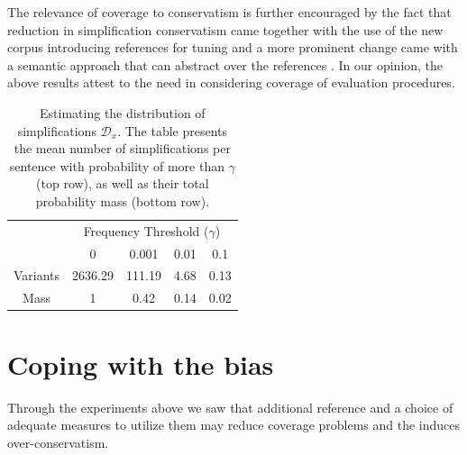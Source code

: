 \documentclass[letterpaper, 11pt]{article}
\begin{document}

 The relevance of coverage to conservatism is further encouraged by the fact that reduction in simplification conservatism came together with the use of the new corpus introducing references for tuning and a more prominent change came with a semantic approach that can abstract over the references \cite{zhang2017sentence}.
 In our opinion, the above results attest to the need in considering coverage of evaluation procedures.

\begin{table}[h!]
	\vspace{-0.5cm}
	\centering
	\small
	\singlespacing
	\begin{tabular}{c|c|c|c|c|}
		& \multicolumn{4}{c|}{Frequency Threshold ($\gamma$)}\\ 
		& \multicolumn{1}{c}{0} & \multicolumn{1}{c}{0.001} & \multicolumn{1}{c}{0.01} & \multicolumn{1}{c|}{0.1}
		\\
		\hline
		Variants & 2636.29 & 111.19 & 4.68 & 0.13
		\\
		Mass & 1 & 0.42 & 0.14 & 0.02\\
		\hline
	\end{tabular}
	\caption{\label{tab:simplifications_dist}
		Estimating the distribution of simplifications $\mathcal{D}_x$.
		The table presents the mean number of simplifications per sentence with probability of more than
		$\gamma$ (top row), as well as their total probability mass (bottom row).
	}
	\vspace{-0.3cm}
\end{table}

\section{Coping with the bias}\label{sec:Semantics}
Through the experiments above we saw that additional reference and a choice of adequate measures to utilize them may reduce coverage problems and the induces over-conservatism.
\end{document}
